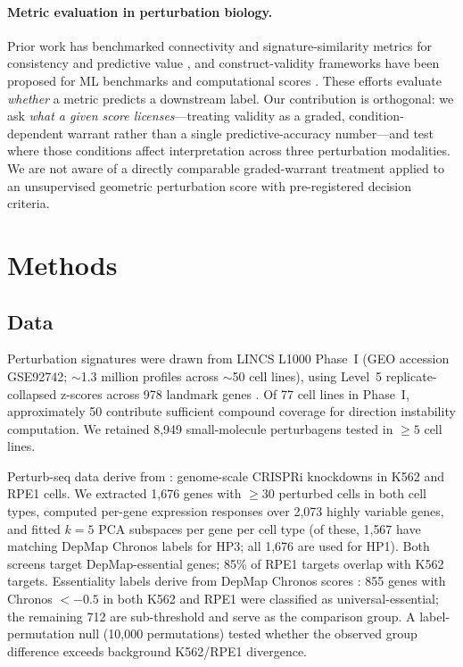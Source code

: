 \documentclass[11pt]{article}
\begin{document}
\paragraph{Metric evaluation in perturbation biology.}
Prior work has benchmarked connectivity and signature-similarity metrics
for consistency and predictive value
\citep{subramanian2017next,li2020comprehensive,napolitano2021reconciling},
and construct-validity
frameworks have been proposed for ML benchmarks and computational scores
\citep{freiesleben2025benchmarking,watson2025measuring}. These efforts
evaluate \emph{whether} a metric predicts a downstream label. Our
contribution is orthogonal: we ask \emph{what a given score licenses}---treating
validity as a graded, condition-dependent warrant rather than a single
predictive-accuracy number---and test where those conditions affect
interpretation across three perturbation modalities. We are not aware of
a directly comparable graded-warrant treatment applied to an unsupervised
geometric perturbation score with pre-registered decision criteria.

\section{Methods}

\subsection{Data}

Perturbation signatures were drawn from LINCS L1000 Phase~I (GEO accession
GSE92742; $\sim$1.3 million profiles across $\sim$50 cell lines),
using Level~5 replicate-collapsed z-scores across 978 landmark genes
\citep{subramanian2017next,keenan2018library}. Of 77 cell lines in Phase~I,
approximately 50 contribute sufficient compound coverage for direction
instability computation. We retained 8{,}949
small-molecule perturbagens tested in $\geq5$ cell lines.

Perturb-seq data derive from \citet{replogle2022mapping}: genome-scale
CRISPRi knockdowns in K562 and RPE1 cells. We extracted 1{,}676 genes
with $\geq$30 perturbed cells in both cell types, computed per-gene
expression responses over 2{,}073 highly variable genes, and fitted
$k = 5$ PCA subspaces per gene per cell type (of these, 1{,}567 have
matching DepMap Chronos labels for HP3; all 1{,}676 are used for HP1).
Both screens target DepMap-essential genes; 85\% of RPE1 targets overlap
with K562 targets. Essentiality labels derive from DepMap Chronos scores
\citep{dempster2021chronos}: 855 genes with Chronos $< -0.5$ in both
K562 and RPE1 were classified as universal-essential; the remaining 712
are sub-threshold and serve as the comparison group. A label-permutation
null (10{,}000 permutations) tested whether the observed group difference
exceeds background K562/RPE1 divergence.
\end{document}

